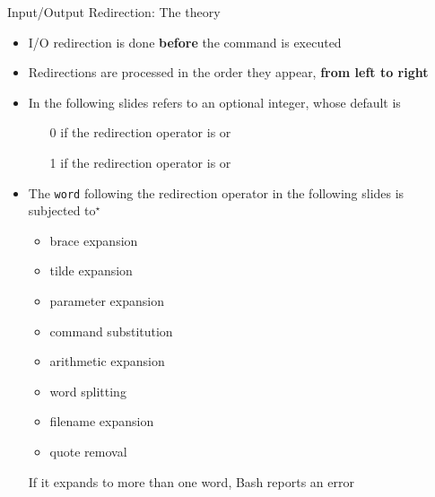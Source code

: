 \begin{frame}{Input/Output Redirection: The theory}
    \vspace{-1mm}
    \begin{itemize}
        \item I/O redirection is done \alert{\textbf{before}} the command is executed
        \item Redirections are processed in the order they appear, \textbf{from left to right}
        \item In the following slides \PB{\texttt{[n]}} refers to an optional integer, whose default is
              \begin{itemize}
                  \item[0] if the redirection operator is \PB{\texttt{<}} or \PB{\texttt{<>}}
                  \item[1] if the redirection operator is \PB{\texttt{>}} or \PB{\texttt{>>}}
              \end{itemize}
        \item The \texttt{word} following the redirection operator in the following slides is subjected to$^\star$
              \begin{itemize}
                  \item brace expansion
                  \item tilde expansion
                  \item parameter expansion
                  \item command substitution
                  \item arithmetic expansion
                  \item word splitting
                  \item filename expansion
                  \item quote removal
              \end{itemize}
              \alert{If it expands to more than one word, Bash reports an error}
    \end{itemize}
\end{frame}
